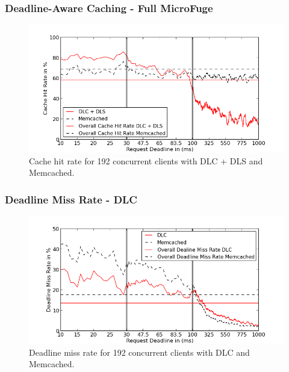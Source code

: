 \documentclass{beamer}
\begin{document}
\begin{frame}
  \frametitle{Deadline-Aware Caching - \textbf{Full MicroFuge}}
  \begin{figure}[t]
    \begin{center}
      \centerline{\includegraphics[scale=0.5]{img/EC2/EC2_SH_MM/cache_48.png}}
      \caption{Cache hit rate for 192 concurrent clients with DLC + DLS and Memcached.}
      \label{fig:cache_192_sh_mm}
    \end{center}
  \end{figure}
\end{frame}

\begin{frame}
  \frametitle{Deadline Miss Rate - \textbf{DLC}}
  \begin{figure}[t]
    \begin{center}
      \centerline{\includegraphics[scale=0.5]{img/EC2/EC2_CS_MM/miss_48.png}}
      \caption{Deadline miss rate for 192 concurrent clients with DLC and Memcached.}
      \label{fig:miss_192_cs_mm}
    \end{center}
  \end{figure}
\end{frame}
\end{document}
